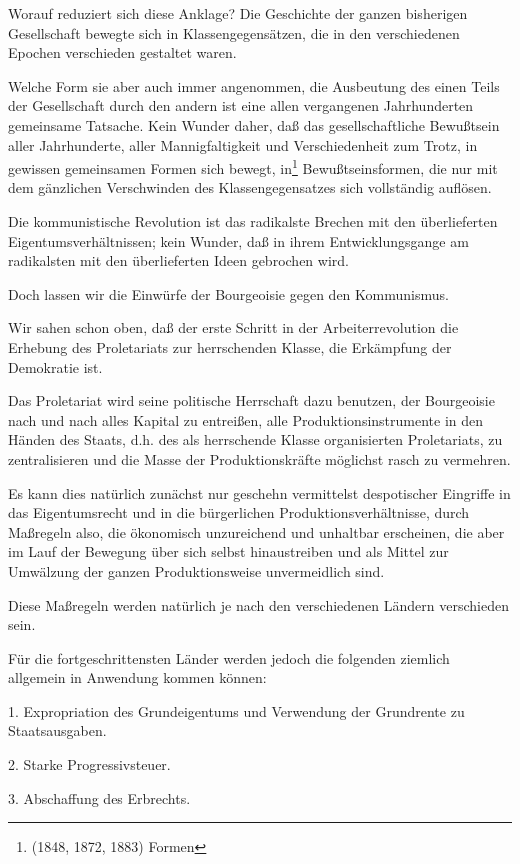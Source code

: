 \documentclass[letterpaper]{article}
\begin{document}
Worauf reduziert sich diese Anklage? Die Geschichte der ganzen bisherigen Gesellschaft bewegte sich in Klassengegensätzen, die in den verschiedenen Epochen verschieden gestaltet waren.

Welche Form sie aber auch immer angenommen, die Ausbeutung des einen Teils der Gesellschaft durch den andern ist eine allen vergangenen Jahrhunderten gemeinsame Tatsache. Kein Wunder daher, daß das gesellschaftliche Bewußtsein aller Jahrhunderte, aller Mannigfaltigkeit und Verschiedenheit zum Trotz, in gewissen gemeinsamen Formen sich bewegt, in\footnote{(1848, 1872, 1883) Formen} Bewußtseinsformen, die nur mit dem gänzlichen Verschwinden des Klassengegensatzes sich vollständig auflösen.

Die kommunistische Revolution ist das radikalste Brechen mit den überlieferten Eigentumsverhältnissen; kein Wunder, daß in ihrem Entwicklungsgange am radikalsten mit den überlieferten Ideen gebrochen wird.

Doch lassen wir die Einwürfe der Bourgeoisie gegen den Kommunismus. 

Wir sahen schon oben, daß der erste Schritt in der Arbeiterrevolution die Erhebung des Proletariats zur herrschenden Klasse, die Erkämpfung der Demokratie ist.

Das Proletariat wird seine politische Herrschaft dazu benutzen, der Bourgeoisie nach und nach alles Kapital zu entreißen, alle Produktionsinstrumente in den Händen des Staats, d.h. des als herrschende Klasse organisierten Proletariats, zu zentralisieren und die Masse der Produktionskräfte möglichst rasch zu vermehren.

Es kann dies natürlich zunächst nur geschehn vermittelst despotischer Eingriffe in das Eigentumsrecht und in die bürgerlichen Produktionsverhältnisse, durch Maßregeln also, die ökonomisch unzureichend und unhaltbar erscheinen, die aber im Lauf der Bewegung über sich selbst hinaustreiben und als Mittel zur Umwälzung der ganzen Produktionsweise unvermeidlich sind.

Diese Maßregeln werden natürlich je nach den verschiedenen Ländern verschieden sein.

Für die fortgeschrittensten Länder werden jedoch die folgenden ziemlich allgemein in Anwendung kommen können:

1. Expropriation des Grundeigentums und Verwendung der Grundrente zu Staatsausgaben.

2. Starke Progressivsteuer.

3. Abschaffung des Erbrechts.
\end{document}
